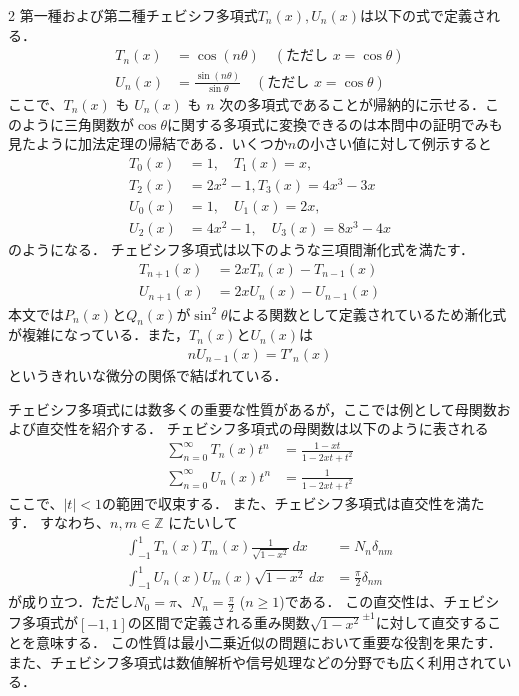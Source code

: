 \documentclass[../../main.tex]{subfiles}
\begin{document}
\begin{multicols}{2}
  第一種および第二種チェビシフ多項式$T_n(x), U_n(x)$は以下の式で定義される．
  \begin{align*}
    T_n(x) & = \cos(n\theta) \quad (\text{ただし } x = \cos\theta)                    \\
    U_n(x) & = \frac{\sin(n\theta)}{\sin\theta} \quad (\text{ただし } x = \cos\theta)
  \end{align*}
  ここで、$T_n(x)$ も $U_n(x)$ も $n$ 次の多項式であることが帰納的に示せる．このように三角関数が$\cos\theta$に関する多項式に変換できるのは本問中の証明でみも見たように加法定理の帰結である．いくつか$n$の小さい値に対して例示すると
  \begin{align*}
    T_0(x) & = 1, \quad T_1(x) = x,               \\
    T_2(x) & = 2x^2 - 1, T_3(x) = 4x^3 - 3x       \\
    U_0(x) & = 1, \quad U_1(x) = 2x,              \\
    U_2(x) & = 4x^2 - 1, \quad U_3(x) = 8x^3 - 4x
  \end{align*}
  のようになる．
  チェビシフ多項式は以下のような三項間漸化式を満たす．
  \begin{align*}
    T_{n+1}(x) & = 2xT_n(x) - T_{n-1}(x) \\
    U_{n+1}(x) & = 2xU_n(x) - U_{n-1}(x)
  \end{align*}
  本文では$P_n(x)$と$Q_n(x)$が$\sin^{2}\theta$による関数として定義されているため漸化式が複雑になっている．また，$T_n(x)$と$U_n(x)$は
  \begin{align*}
    nU_{n-1}(x) = T'_n(x)
  \end{align*}
  というきれいな微分の関係で結ばれている．

  チェビシフ多項式には数多くの重要な性質があるが，ここでは例として母関数および直交性を紹介する．
  チェビシフ多項式の母関数は以下のように表される
  \begin{align*}
    \sum_{n=0}^{\infty} T_n(x) t^n & = \frac{1 - xt}{1 - 2xt + t^2} \\
    \sum_{n=0}^{\infty} U_n(x) t^n & = \frac{1}{1 - 2xt + t^2}
  \end{align*}
  ここで、$|t|<1$の範囲で収束する．
  また、チェビシフ多項式は直交性を満たす．
  すなわち、$n, m \in \mathbb{Z}$ にたいして
  \begin{align*}
    \int_{-1}^{1} T_n(x) T_m(x)\frac{1}{\sqrt{1-x^2}} \, dx & = N_{n}\delta_{nm}          \\
    \int_{-1}^{1}  U_n(x) U_m(x) \sqrt{1-x^2} \, dx         & = \frac{\pi}{2} \delta_{nm}
  \end{align*}
  が成り立つ．ただし$N_0=\pi$、$N_n = \frac{\pi}{2}$ ($n \ge 1$)である．
  この直交性は、チェビシフ多項式が$[-1, 1]$の区間で定義される重み関数$\sqrt{1-x^2}^{\pm 1}$に対して直交することを意味する．
  この性質は最小二乗近似の問題において重要な役割を果たす．
  また、チェビシフ多項式は数値解析や信号処理などの分野でも広く利用されている．


\end{multicols}
\end{document}
